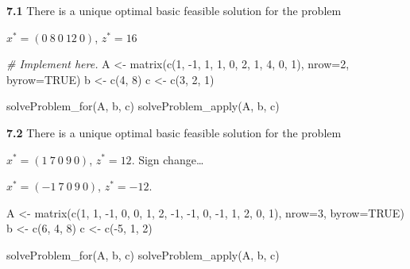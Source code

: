 \documentclass[
]{article}
\newenvironment{Shaded}{\begin{snugshade}}{\end{snugshade}}
\newcommand{\AttributeTok}[1]{\textcolor[rgb]{0.77,0.63,0.00}{#1}}
\newcommand{\CommentTok}[1]{\textcolor[rgb]{0.56,0.35,0.01}{\textit{#1}}}
\newcommand{\ConstantTok}[1]{\textcolor[rgb]{0.00,0.00,0.00}{#1}}
\newcommand{\DecValTok}[1]{\textcolor[rgb]{0.00,0.00,0.81}{#1}}
\newcommand{\FunctionTok}[1]{\textcolor[rgb]{0.00,0.00,0.00}{#1}}
\newcommand{\NormalTok}[1]{#1}
\newcommand{\OtherTok}[1]{\textcolor[rgb]{0.56,0.35,0.01}{#1}}
\newcommand{\SpecialCharTok}[1]{\textcolor[rgb]{0.00,0.00,0.00}{#1}}
\begin{document}
\textbf{7.1} There is a unique optimal basic feasible solution for the
problem

\(x^*= (0\  8\  0\ 12\  0)\), \(z^*= 16\)

\begin{Shaded}
\begin{Highlighting}[]
\CommentTok{\# Implement here.}
\NormalTok{A }\OtherTok{\textless{}{-}} \FunctionTok{matrix}\NormalTok{(}\FunctionTok{c}\NormalTok{(}\DecValTok{1}\NormalTok{, }\SpecialCharTok{{-}}\DecValTok{1}\NormalTok{, }\DecValTok{1}\NormalTok{, }\DecValTok{1}\NormalTok{, }\DecValTok{0}\NormalTok{, }\DecValTok{2}\NormalTok{, }\DecValTok{1}\NormalTok{, }\DecValTok{4}\NormalTok{, }\DecValTok{0}\NormalTok{, }\DecValTok{1}\NormalTok{), }\AttributeTok{nrow=}\DecValTok{2}\NormalTok{, }\AttributeTok{byrow=}\ConstantTok{TRUE}\NormalTok{)}
\NormalTok{b }\OtherTok{\textless{}{-}} \FunctionTok{c}\NormalTok{(}\DecValTok{4}\NormalTok{, }\DecValTok{8}\NormalTok{)}
\NormalTok{c }\OtherTok{\textless{}{-}} \FunctionTok{c}\NormalTok{(}\DecValTok{3}\NormalTok{, }\DecValTok{2}\NormalTok{, }\DecValTok{1}\NormalTok{)}

\FunctionTok{solveProblem\_for}\NormalTok{(A, b, c)}
\FunctionTok{solveProblem\_apply}\NormalTok{(A, b, c)}
\end{Highlighting}
\end{Shaded}

\textbf{7.2} There is a unique optimal basic feasible solution for the
problem

\(x^*= (1\ 7\ 0\ 9\ 0)\), \(z^*= 12\). Sign change\ldots{}

\(x^*= (-1\ 7\ 0\ 9\ 0)\), \(z^*= -12\).

\begin{Shaded}
\begin{Highlighting}[]
\NormalTok{A }\OtherTok{\textless{}{-}} \FunctionTok{matrix}\NormalTok{(}\FunctionTok{c}\NormalTok{(}\DecValTok{1}\NormalTok{, }\DecValTok{1}\NormalTok{, }\SpecialCharTok{{-}}\DecValTok{1}\NormalTok{, }\DecValTok{0}\NormalTok{, }\DecValTok{0}\NormalTok{, }\DecValTok{1}\NormalTok{, }\DecValTok{2}\NormalTok{, }\SpecialCharTok{{-}}\DecValTok{1}\NormalTok{, }\SpecialCharTok{{-}}\DecValTok{1}\NormalTok{, }\DecValTok{0}\NormalTok{, }\SpecialCharTok{{-}}\DecValTok{1}\NormalTok{, }\DecValTok{1}\NormalTok{, }\DecValTok{2}\NormalTok{, }\DecValTok{0}\NormalTok{, }\DecValTok{1}\NormalTok{), }\AttributeTok{nrow=}\DecValTok{3}\NormalTok{, }\AttributeTok{byrow=}\ConstantTok{TRUE}\NormalTok{)}
\NormalTok{b }\OtherTok{\textless{}{-}} \FunctionTok{c}\NormalTok{(}\DecValTok{6}\NormalTok{, }\DecValTok{4}\NormalTok{, }\DecValTok{8}\NormalTok{)}
\NormalTok{c }\OtherTok{\textless{}{-}} \FunctionTok{c}\NormalTok{(}\SpecialCharTok{{-}}\DecValTok{5}\NormalTok{, }\DecValTok{1}\NormalTok{, }\DecValTok{2}\NormalTok{)}

\FunctionTok{solveProblem\_for}\NormalTok{(A, b, c)}
\FunctionTok{solveProblem\_apply}\NormalTok{(A, b, c)}
\end{Highlighting}
\end{Shaded}
\end{document}
